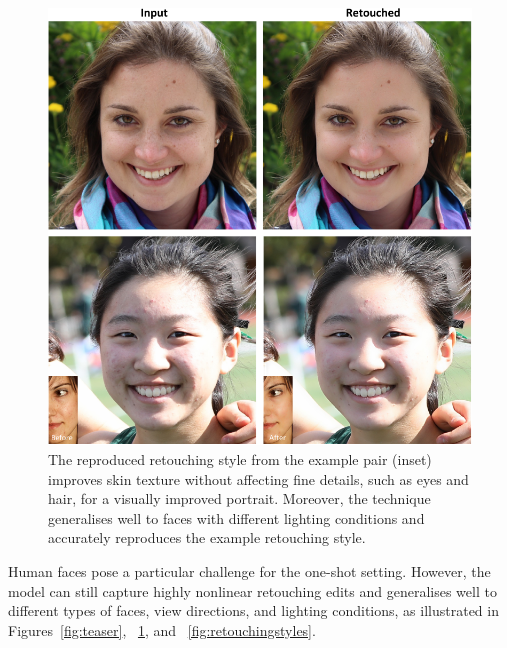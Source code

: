 \begin{figure}[th] %
    \centering
	\includegraphics[width=0.8\columnwidth]{Chapters/detail-retouching-figs/res_diff_light_2_cvmp.pdf}
    \caption{\label{fig:newdataset_ex}The reproduced retouching style from the example pair (inset) improves skin texture without affecting fine details, such as eyes and hair, for a visually improved portrait. Moreover, the technique generalises well to faces with different lighting conditions and accurately reproduces the example retouching style.}
 
\end{figure}
Human faces pose a particular challenge for the one-shot setting. However, the model can still capture highly nonlinear retouching edits and generalises well to different types of faces, view directions, and lighting conditions, as illustrated in Figures~\ref{fig:teaser}, ~\ref{fig:newdataset_ex}, and ~\ref{fig:retouchingstyles}.

